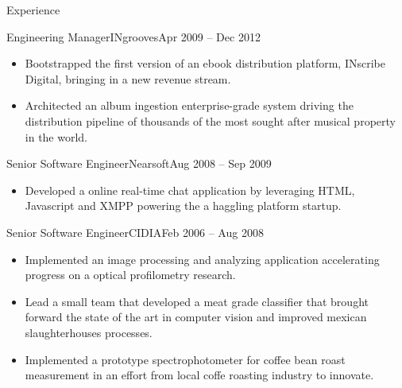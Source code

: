 \documentclass{mcdowellcv}
\begin{document}
\begin{cvsection}{Experience}
\begin{cvsubsection}{Engineering Manager}{INgrooves}{Apr 2009 -- Dec 2012}
\begin{itemize}
    \item Bootstrapped the first version of an ebook distribution platform, INscribe Digital, bringing in a new revenue stream.
    \item Architected an album ingestion enterprise-grade system driving the distribution pipeline of thousands of the most sought after musical property in the world.
		\end{itemize}
	\end{cvsubsection}
	\begin{cvsubsection}{Senior Software Engineer}{Nearsoft}{Aug 2008 -- Sep 2009}
		\begin{itemize}%
    \item Developed a online real-time chat application by leveraging HTML, Javascript and XMPP powering the a haggling platform startup.
		\end{itemize}
	\end{cvsubsection}
	\begin{cvsubsection}{Senior Software Engineer}{CIDIA}{Feb 2006 -- Aug 2008}
		\begin{itemize}%
    \item Implemented an image processing and analyzing application accelerating progress on a optical profilometry research.
    \item Lead a small team that developed a meat grade classifier that brought forward the state of the art in computer vision and improved mexican slaughterhouses processes.
    \item Implemented a prototype spectrophotometer for coffee bean roast measurement in an effort from local coffe roasting industry to innovate.
		\end{itemize}
	\end{cvsubsection}
\end{cvsection}
\end{document}
